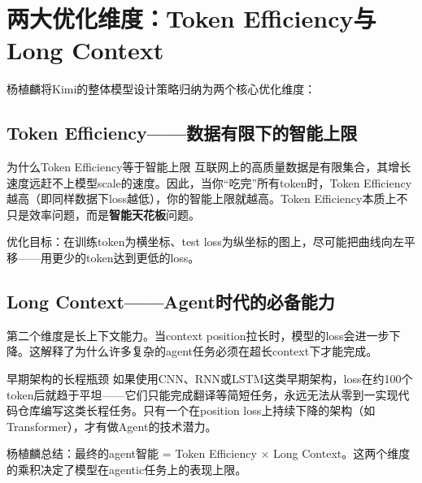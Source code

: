 \section{两大优化维度：Token Efficiency与Long Context}

杨植麟将Kimi的整体模型设计策略归纳为两个核心优化维度：

\subsection{Token Efficiency——数据有限下的智能上限}

\begin{importantbox}{为什么Token Efficiency等于智能上限}
互联网上的高质量数据是有限集合，其增长速度远赶不上模型scale的速度。因此，当你``吃完''所有token时，Token Efficiency越高（即同样数据下loss越低），你的智能上限就越高。Token Efficiency本质上不只是效率问题，而是\textbf{智能天花板}问题。
\end{importantbox}

优化目标：在训练token为横坐标、test loss为纵坐标的图上，尽可能把曲线向左平移——用更少的token达到更低的loss。

\subsection{Long Context——Agent时代的必备能力}

第二个维度是长上下文能力。当context position拉长时，模型的loss会进一步下降。这解释了为什么许多复杂的agent任务必须在超长context下才能完成。

\begin{warningbox}{早期架构的长程瓶颈}
如果使用CNN、RNN或LSTM这类早期架构，loss在约100个token后就趋于平坦——它们只能完成翻译等简短任务，永远无法从零到一实现代码仓库编写这类长程任务。只有一个在position loss上持续下降的架构（如Transformer），才有做Agent的技术潜力。
\end{warningbox}

杨植麟总结：最终的agent智能 = Token Efficiency $\times$ Long Context。这两个维度的乘积决定了模型在agentic任务上的表现上限。


